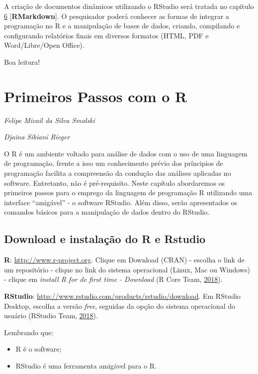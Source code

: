 \documentclass[12pt,brazil,oneside]{book}
\providecommand{\tightlist}{%
  \setlength{\itemsep}{0pt}\setlength{\parskip}{0pt}}
\begin{document}
A criação de documentos dinâmicos utilizando o RStudio será tratada no capítulo \protect\hyperlink{rmark}{6} {[}\textbf{RMarkdown}{]}. O pesquisador poderá conhecer as formas de integrar a programação no R e a manipulação de bases de dados, criando, compilando e configurando relatórios finais em diversos formatos (HTML, PDF e Word/Libre/Open Office).

Boa leitura!

\hypertarget{intro}{%
\chapter{Primeiros Passos com o R}\label{intro}}

\emph{Felipe Micail da Silva Smolski}

\emph{Djaina Sibiani Rieger}

\begin{flushright}
\emph{}
\end{flushright}

O R é um ambiente voltado para análise de dados com o uso de uma linguagem de programação, frente a isso um conhecimento prévio dos príncipios de programação facilita a compreensão da condução das análises aplicadas no software. Entretanto, não é pré-requisito. Neste capítulo abordaremos os primeiros passos para o emprego da linguagem de programação R utilizando uma interface ``amigável'' - o software RStudio. Além disso, serão apresentados os comandos básicos para a manipulação de dados dentro do RStudio.

\hypertarget{download-e-instalacao-do-r-e-rstudio}{%
\section{Download e instalação do R e Rstudio}\label{download-e-instalacao-do-r-e-rstudio}}

\textbf{R}: \url{http://www.r-project.org}. Clique em Download (CRAN) - escolha o link de um repositório - clique no link do sistema operacional (Linux, Mac ou Windows) - clique em \emph{install R for de first time - Download} (R Core Team, \protect\hyperlink{ref-rcore}{2018}).

\textbf{RStudio}: \url{http://www.rstudio.com/products/rstudio/download}. Em RStudio Desktop, escolha a versão \emph{free}, seguidas da opção do sistema operacional do usuário (RStudio Team, \protect\hyperlink{ref-teamrstudio}{2018}).

Lembrando que:

\begin{itemize}
\tightlist
\item
  R é o software;
\item
  RStudio é uma ferramenta amigável para o R.
\end{itemize}
\end{document}

